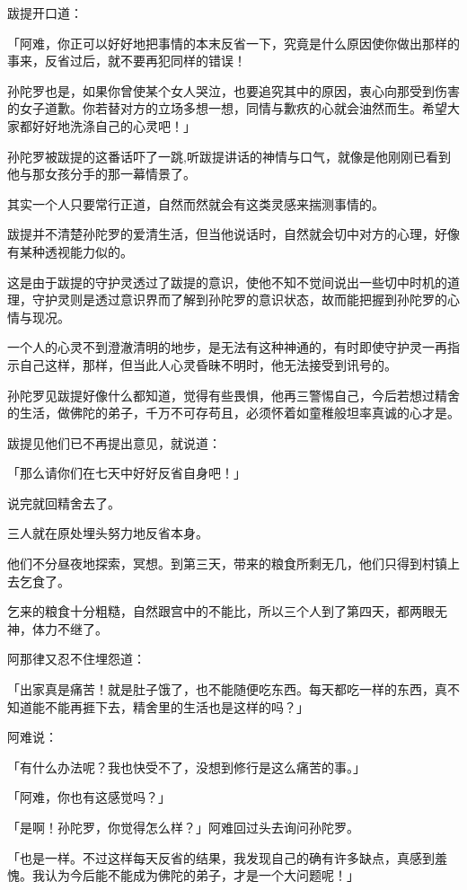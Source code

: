\documentclass[twoside,openany]{book}
\begin{document}
跋提开口道：

「阿难，你正可以好好地把事情的本末反省一下，究竟是什么原因使你做出那样的事来，反省过后，就不要再犯同样的错误！

孙陀罗也是，如果你曾使某个女人哭泣，也要追究其中的原因，衷心向那受到伤害的女子道歉。你若替对方的立场多想一想，同情与歉疚的心就会油然而生。希望大家都好好地洗涤自己的心灵吧！」

孙陀罗被跋提的这番话吓了一跳,听跋提讲话的神情与口气，就像是他刚刚已看到他与那女孩分手的那一幕情景了。

其实一个人只要常行正道，自然而然就会有这类灵感来揣测事情的。

跋提并不清楚孙陀罗的爱清生活，但当他说话时，自然就会切中对方的心理，好像有某种透视能力似的。

这是由于跋提的守护灵透过了跋提的意识，使他不知不觉间说出一些切中时机的道理，守护灵则是透过意识界而了解到孙陀罗的意识状态，故而能把握到孙陀罗的心情与现况。

一个人的心灵不到澄澈清明的地步，是无法有这种神通的，有时即使守护灵一再指示自己这样，那样，但当此人心灵昏昧不明时，他无法接受到讯号的。

孙陀罗见跋提好像什么都知道，觉得有些畏惧，他再三警惕自己，今后若想过精舍的生活，做佛陀的弟子，千万不可存苟且，必须怀着如童稚般坦率真诚的心才是。

跋提见他们已不再提出意见，就说道：

「那么请你们在七天中好好反省自身吧！」

说完就回精舍去了。

三人就在原处埋头努力地反省本身。

他们不分昼夜地探索，冥想。到第三天，带来的粮食所剩无几，他们只得到村镇上去乞食了。

乞来的粮食十分粗糙，自然跟宫中的不能比，所以三个人到了第四天，都两眼无神，体力不继了。

阿那律又忍不住埋怨道：

「出家真是痛苦！就是肚子饿了，也不能随便吃东西。每天都吃一样的东西，真不知道能不能再捱下去，精舍里的生活也是这样的吗？」

阿难说：

「有什么办法呢？我也快受不了，没想到修行是这么痛苦的事。」

「阿难，你也有这感觉吗？」

「是啊！孙陀罗，你觉得怎么样？」阿难回过头去询问孙陀罗。

「也是一样。不过这样每天反省的结果，我发现自己的确有许多缺点，真感到羞愧。我认为今后能不能成为佛陀的弟子，才是一个大问题呢！」
\end{document}
